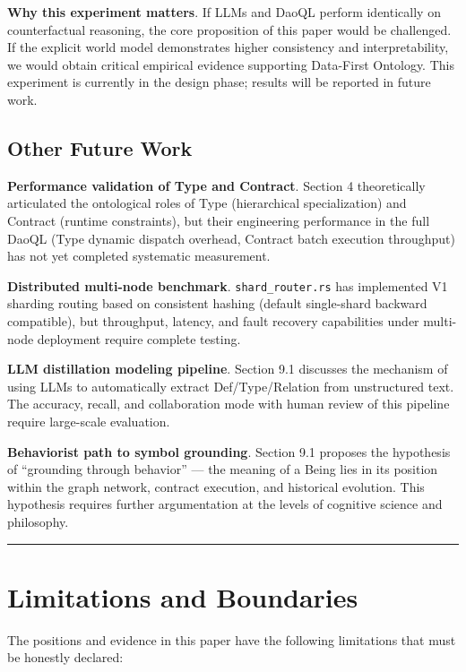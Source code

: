 \documentclass[11pt,a4paper]{article}
\begin{document}
\textbf{Why this experiment matters}. If LLMs and DaoQL perform
identically on counterfactual reasoning, the core proposition of this
paper would be challenged. If the explicit world model demonstrates
higher consistency and interpretability, we would obtain critical
empirical evidence supporting Data-First Ontology. This experiment is
currently in the design phase; results will be reported in future work.

\subsection{Other Future Work}\label{other-future-work}

\textbf{Performance validation of Type and Contract}. Section 4
theoretically articulated the ontological roles of Type (hierarchical
specialization) and Contract (runtime constraints), but their
engineering performance in the full DaoQL (Type dynamic dispatch
overhead, Contract batch execution throughput) has not yet completed
systematic measurement.

\textbf{Distributed multi-node benchmark}. \texttt{shard\_router.rs} has
implemented V1 sharding routing based on consistent hashing (default
single-shard backward compatible), but throughput, latency, and fault
recovery capabilities under multi-node deployment require complete
testing.

\textbf{LLM distillation modeling pipeline}. Section 9.1 discusses the
mechanism of using LLMs to automatically extract Def/Type/Relation from
unstructured text. The accuracy, recall, and collaboration mode with
human review of this pipeline require large-scale evaluation.

\textbf{Behaviorist path to symbol grounding}. Section 9.1 proposes the
hypothesis of ``grounding through behavior'' --- the meaning of a Being
lies in its position within the graph network, contract execution, and
historical evolution. This hypothesis requires further argumentation at
the levels of cognitive science and philosophy.

\begin{center}\rule{0.5\linewidth}{0.5pt}\end{center}

\section{Limitations and
Boundaries}\label{limitations-and-boundaries}

The positions and evidence in this paper have the following limitations
that must be honestly declared:
\end{document}
